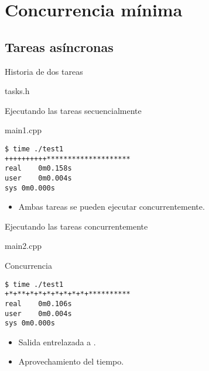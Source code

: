 \section{Concurrencia mínima}

\subsection{Tareas asíncronas}

\begin{frame}[t]{Historia de dos tareas}
\begin{block}{tasks.h}

\end{block}
\end{frame}

\begin{frame}[t,fragile]{Ejecutando las tareas secuencialmente}
\begin{block}{main1.cpp}

\end{block}
\begin{lstlisting}[style=terminal]
$ time ./test1
++++++++++********************
real	0m0.158s
user	0m0.004s
sys	0m0.000s
\end{lstlisting}

\begin{itemize}
  \item Ambas tareas se pueden ejecutar concurrentemente.
\end{itemize}

\end{frame}


\begin{frame}[t,fragile]{Ejecutando las tareas concurrentemente}
\begin{block}{main2.cpp}

\end{block}
\end{frame}

\begin{frame}[t,fragile]{Concurrencia}
\begin{lstlisting}[style=terminal]
$ time ./test1
+*+**+*+*+*+*+*+*+*+**********
real	0m0.106s
user	0m0.004s
sys	0m0.000s
\end{lstlisting}

\begin{itemize}
  \item Salida entrelazada a .
  \item Aprovechamiento del tiempo.
\end{itemize}

\end{frame}

